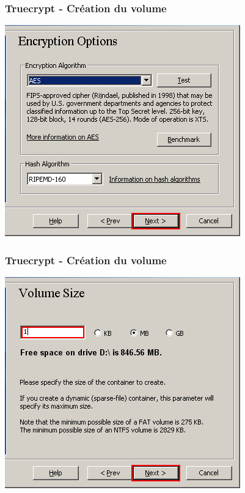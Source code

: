 \documentclass{beamer}
\begin{document}
\begin{frame}
\frametitle{Truecrypt - Création du volume}
\begin{center}
\includegraphics[scale=0.5] {./images/Truecrypt07.png} 
\end{center}
\end{frame}
\begin{frame}
\frametitle{Truecrypt - Création du volume}
\begin{center}
\includegraphics[scale=0.5] {./images/Truecrypt08.png} 
\end{center}
\end{frame}
\end{document}
